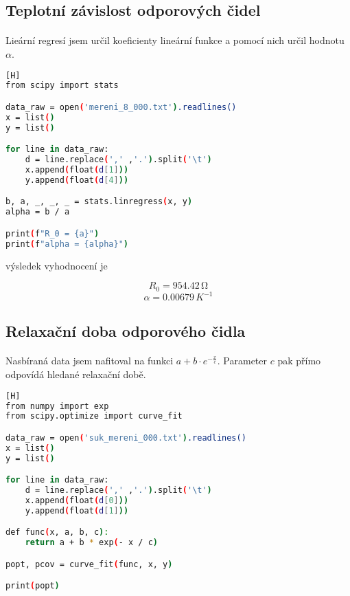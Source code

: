 \documentclass[a4paper,11pt]{article}
\begin{document}
    \subsection{Teplotní závislost odporových čidel}

        \paragraph{} Lieární regresí jsem určil koeficienty lineární funkce a
        pomocí nich určil hodnotu $\alpha$.

\begin{lstlisting}[language=Bash][H]
from scipy import stats

data_raw = open('mereni_8_000.txt').readlines()
x = list()
y = list()

for line in data_raw:
    d = line.replace(',' ,'.').split('\t')
    x.append(float(d[1]))
    y.append(float(d[4]))

b, a, _, _, _ = stats.linregress(x, y)
alpha = b / a

print(f"R_0 = {a}")
print(f"alpha = {alpha}")\end{lstlisting}

        výsledek vyhodnocení je

        $$ R_{0} = 954.42 \, \si{\ohm} $$
        $$ \alpha = 0.00679 \, K^{-1} $$

    \subsection{Relaxační doba odporového čidla}

        \paragraph{} Nasbíraná data jsem nafitoval na funkci $a + b \cdot e^{- \frac{x}{c}}$.
        Parameter $c$ pak přímo odpovídá hledané relaxační době.

\begin{lstlisting}[language=Bash][H]
from numpy import exp
from scipy.optimize import curve_fit

data_raw = open('suk_mereni_000.txt').readlines()
x = list()
y = list()

for line in data_raw:
    d = line.replace(',' ,'.').split('\t')
    x.append(float(d[0]))
    y.append(float(d[1]))

def func(x, a, b, c):
    return a + b * exp(- x / c)

popt, pcov = curve_fit(func, x, y)

print(popt)\end{lstlisting}
\end{document}
